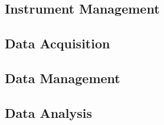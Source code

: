 
\subsection{Instrument Management}


\subsection{Data Acquisition}


\subsection{Data Management}


\subsection{Data Analysis}

